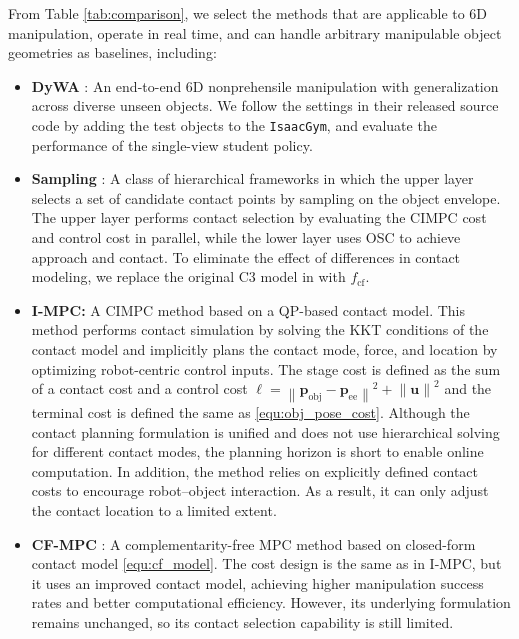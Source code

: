 From Table \ref{tab:comparison}, we select the methods that are applicable to 6D manipulation, operate in real time, and can handle arbitrary manipulable object geometries as baselines, including:
\begin{itemize}
    \item \textbf{DyWA} \cite{lyu2025dywa}:  An end-to-end 6D nonprehensile manipulation with generalization across diverse unseen objects. We follow the settings in their released source code by adding the test objects to the \texttt{IsaacGym}, and evaluate the performance of the single-view student policy. 
    \item \textbf{Sampling} \cite{venkatesh2025approximating}: A class of hierarchical frameworks  in which the upper layer selects a set of candidate contact points by sampling on the object envelope. The upper layer performs contact selection by evaluating the CIMPC cost and control cost in parallel, while the lower layer uses OSC to achieve approach and contact. To eliminate the effect of differences in contact modeling, we replace the original C3 model \cite{aydinoglu2024consensus} in \cite{venkatesh2025approximating} with $f_{\text{cf}}$.
    \item \textbf{I-MPC:} A CIMPC method based on a QP-based contact model. This method performs contact simulation by solving the KKT conditions of the contact model and implicitly plans the contact mode, force, and location by optimizing robot-centric control inputs. The stage cost is defined as the sum of a contact cost and a control cost $\ell = \left \| \boldsymbol{p}_{\text{obj}} - \boldsymbol{p}_{\text{ee}} \right \|^2 +\left \| \boldsymbol{u} \right \|^2$
and the terminal cost is defined the same as \eqref{equ:obj_pose_cost}. Although the contact planning formulation is unified and does not use hierarchical solving for different contact modes, the planning horizon is short to enable online computation. In addition, the method relies on explicitly defined contact costs to encourage robot–object interaction. As a result, it can only adjust the contact location to a  limited extent.
    \item \textbf{CF-MPC} \cite{jin2024complementarity}: A complementarity-free MPC method based on closed-form contact model \eqref{equ:cf_model}. The cost design is the same as in I-MPC, but it uses an improved contact model, achieving higher manipulation success rates and better computational efficiency. However, its underlying formulation remains unchanged, so its contact selection capability is still limited.

\end{itemize}
